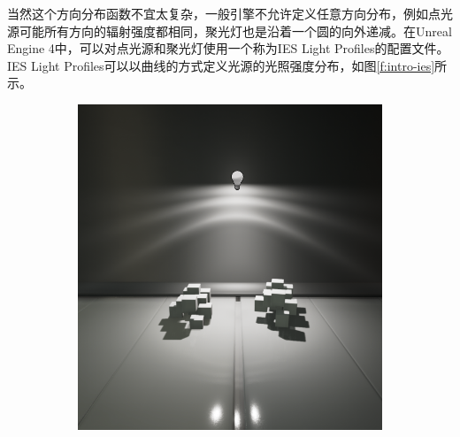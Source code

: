 当然这个方向分布函数不宜太复杂，一般引擎不允许定义任意方向分布，例如点光源可能所有方向的辐射强度都相同，聚光灯也是沿着一个圆的向外递减。在Unreal Engine 4中，可以对点光源和聚光灯使用一个称为IES Light Profiles的配置文件。IES Light Profiles可以以曲线的方式定义光源的光照强度分布，如图\ref{f:intro-ies}所示。

\begin{figure}
\begin{fullwidth}
	\begin{subfigure}[b]{0.209\thewidth}
		\includegraphics[width=1.\textwidth]{figures/intro/IES_01}
	\end{subfigure}
	\begin{subfigure}[b]{0.213\thewidth}

\end{subfigure}
\end{fullwidth}
\end{figure}
